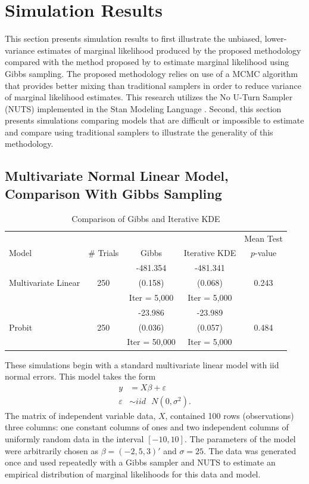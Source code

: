 \documentclass[twocolumn]{article}
\newcommand{\ep}{\varepsilon}
\begin{document}
\section{Simulation Results}

This section presents simulation results to first illustrate the unbiased, lower-variance estimates of marginal likelihood produced by the proposed methodology compared with the method proposed by \cite{Chib} to estimate marginal likelihood using Gibbs sampling. The proposed methodology relies on use of a MCMC algorithm that provides better mixing than traditional samplers in order to reduce variance of marginal likelihood estimates. This research utilizes the No U-Turn Sampler (NUTS) implemented in the Stan Modeling Language \citep{rstan}. Second, this section presents simulations comparing models that are difficult or impossible to estimate and compare using traditional samplers to illustrate the generality of this methodology.

\subsection{Multivariate Normal Linear Model, Comparison With Gibbs Sampling}

\begin{table}
	\centering
	\begin{tabular}{l|c|c|c|c}
		& & & & Mean Test \\
		Model & \# Trials & Gibbs & Iterative KDE & $p$-value \\ \hline\hline
		\multirow{3}{*}{Multivariate Linear} & \multirow{3}{*}{250} & -481.354 & -481.341 & \multirow{3}{*}{0.243}\\
		& & (0.158) & (0.068) & \\
		& & Iter = 5,000 & Iter = 5,000 & \\
		\hline
		\multirow{3}{*}{Probit} & \multirow{3}{*}{250} & -23.986 & -23.989 & \multirow{3}{*}{0.484} \\
		& & (0.036) & (0.057) & \\
		& & Iter = 50,000 & Iter = 5,000 & \\
		\hline
	\end{tabular}
	\caption{Comparison of Gibbs and Iterative KDE}
	\label{tab:MVN-Probit}
\end{table}

These simulations begin with a standard multivariate linear model with iid normal errors. This model takes the form
\begin{align}
	y &= X\beta + \ep \\
	\ep &\sim iid \mbox{ }N(0, \sigma^2). 
\end{align}
The matrix of independent variable data, $X$, contained 100 rows (observations) three columns: one constant columns of ones and two independent columns of uniformly random data in the interval $[-10, 10]$. The parameters of the model were arbitrarily chosen as $\beta = (-2, 5, 3)'$ and $\sigma = 25$. The data was generated once and used repeatedly with a Gibbs sampler and NUTS to estimate an empirical distribution of marginal likelihoods for this data and model.
\end{document}
